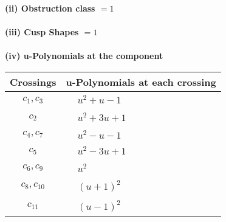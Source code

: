 \documentclass[1p]{elsarticle_modified}
\theoremstyle{definition}
\begin{document}
\flushleft \textbf{(ii) Obstruction class $= 1$}\\~\\
\flushleft \textbf{(iii) Cusp Shapes $= 1$}\\~\\
\newpage\renewcommand{\arraystretch}{1}
\flushleft \textbf{(iv) u-Polynomials at the component}\newline \\
\begin{tabular}{m{50pt}|m{274pt}}
Crossings & \hspace{64pt}u-Polynomials at each crossing \\
\hline $$\begin{aligned}c_{1},c_{3}\end{aligned}$$&$\begin{aligned}
&u^2+u-1
\end{aligned}$\\
\hline $$\begin{aligned}c_{2}\end{aligned}$$&$\begin{aligned}
&u^2+3 u+1
\end{aligned}$\\
\hline $$\begin{aligned}c_{4},c_{7}\end{aligned}$$&$\begin{aligned}
&u^2- u-1
\end{aligned}$\\
\hline $$\begin{aligned}c_{5}\end{aligned}$$&$\begin{aligned}
&u^2-3 u+1
\end{aligned}$\\
\hline $$\begin{aligned}c_{6},c_{9}\end{aligned}$$&$\begin{aligned}
&u^2
\end{aligned}$\\
\hline $$\begin{aligned}c_{8},c_{10}\end{aligned}$$&$\begin{aligned}
&(u+1)^2
\end{aligned}$\\
\hline $$\begin{aligned}c_{11}\end{aligned}$$&$\begin{aligned}
&(u-1)^2
\end{aligned}$\\
\hline
\end{tabular}\\~\\
\end{document}
